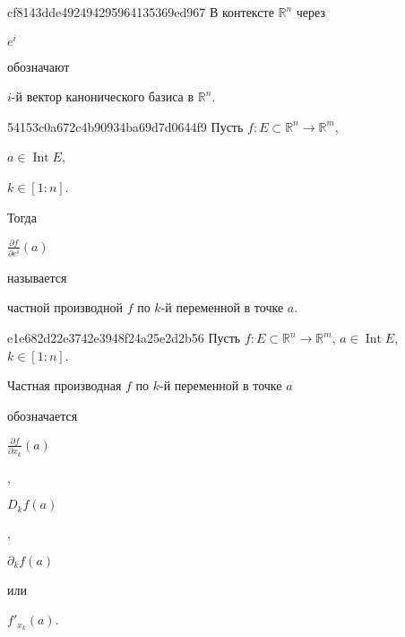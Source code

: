 \begin{note}{cf8143dde492494295964135369ed967}
    В контексте \({ \mathbb R^{n} }\) через \begin{icloze}{2}\({ e^{i} }\)\end{icloze} обозначают \begin{icloze}{1}\({ i }\)-й вектор канонического базиса в \({ \mathbb R^{n} }\).\end{icloze}
\end{note}

\begin{note}{54153c0a672c4b90934ba69d7d0644f9}
    Пусть \({ f : E \subset \mathbb R^{n} \to \mathbb R^{m} }\),\: \begin{icloze}{4}\({ a \in \operatorname{Int} E }\),\end{icloze}\: \begin{icloze}{3}\({ k \in [1 : n] }\).\end{icloze}
    Тогда \begin{icloze}{2}\({ \frac{\partial f}{\partial e^{i}}(a) }\)\end{icloze} называется \begin{icloze}{1}частной производной \({ f }\) по \({ k }\)-й переменной в точке \({ a }\).\end{icloze}
\end{note}

\begin{note}{e1e682d22e3742e3948f24a25e2d2b56}
    Пусть \({ f : E \subset \mathbb R^{n} \to \mathbb R^{m} }\),\: \({ a \in \operatorname{Int} E }\),\: \({ k \in [1 : n] }\).
    \begin{icloze}{2}Частная производная \({ f }\) по \({ k }\)-й переменной в точке \({ a }\)\end{icloze} обозначается
    \begin{center}
        \begin{icloze}{1}\({ \frac{\partial f}{\partial x_k}(a) }\)\end{icloze},\: \begin{icloze}{1}\({ D_k f(a) }\)\end{icloze},\: \begin{icloze}{1}\({ \partial_k f(a) }\)\end{icloze} или \begin{icloze}{1}\({ f'_{x_k}(a) }\).\end{icloze}
    \end{center}
\end{note}

